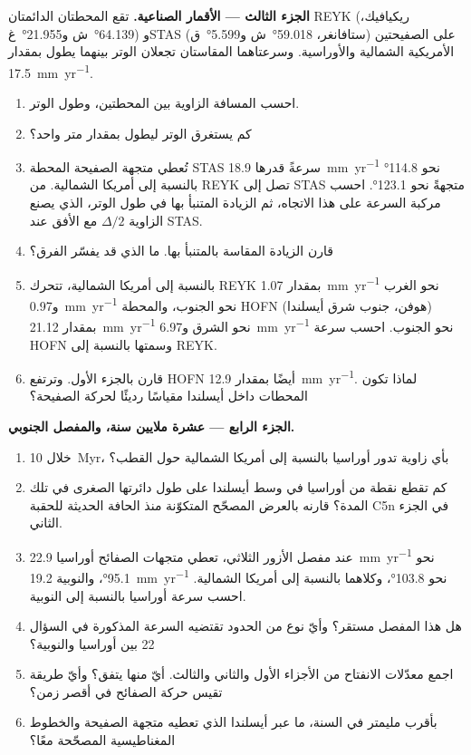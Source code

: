 \begin{problem}
\noindent\textbf{الجزء الثالث --- الأقمار الصناعية.}
تقع المحطتان الدائمتان REYK (ريكيافيك، \ang{64.139}~ش و\ang{21.955}~غ) وSTAS (ستافانغر، \ang{59.018}~ش و\ang{5.599}~ق) على الصفيحتين الأمريكية الشمالية والأوراسية. وسرعتاهما المقاستان تجعلان الوتر بينهما يطول بمقدار \qty{17.5}{mm.yr^{-1}}.
\begin{enumerate}[resume]
  \item احسب المسافة الزاوية بين المحطتين، وطول الوتر.
  \item كم يستغرق الوتر ليطول بمقدار متر واحد؟
  \item تُعطي متجهة الصفيحة المحطة STAS سرعةً قدرها \qty{18.9}{mm.yr^{-1}} نحو \ang{114.8} بالنسبة إلى أمريكا الشمالية.  من REYK تصل إلى STAS متجهةً نحو \ang{123.1}. احسب مركبة السرعة على هذا الاتجاه، ثم الزيادة المتنبأ بها في طول الوتر، الذي يصنع الزاوية $\Delta/2$ مع الأفق عند STAS.
  \item قارن الزيادة المقاسة بالمتنبأ بها. ما الذي قد يفسّر الفرق؟
  \item بالنسبة إلى أمريكا الشمالية، تتحرك REYK بمقدار \qty{1.07}{mm.yr^{-1}} نحو الغرب و\qty{0.97}{mm.yr^{-1}} نحو الجنوب، والمحطة HOFN (هوفن، جنوب شرق أيسلندا) بمقدار \qty{21.12}{mm.yr^{-1}} نحو الشرق و\qty{6.97}{mm.yr^{-1}} نحو الجنوب. احسب سرعة HOFN وسمتها بالنسبة إلى REYK.
  \item قارن بالجزء الأول. وترتفع HOFN أيضًا بمقدار \qty{12.9}{mm.yr^{-1}}. لماذا تكون المحطات داخل أيسلندا مقياسًا رديئًا لحركة الصفيحة؟
\end{enumerate}

\noindent\textbf{الجزء الرابع --- عشرة ملايين سنة، والمفصل الجنوبي.}
\begin{enumerate}[resume]
  \item خلال \qty{10}{Myr}، بأي زاوية تدور أوراسيا بالنسبة إلى أمريكا الشمالية حول القطب؟
  \item كم تقطع نقطة من أوراسيا في وسط أيسلندا على طول دائرتها الصغرى في تلك المدة؟ قارنه بالعرض المصحّح  المتكوّنة منذ الحافة الحديثة للحقبة C5n في الجزء الثاني.
  \item عند مفصل الأزور الثلاثي، تعطي متجهات الصفائح أوراسيا \qty{22.9}{mm.yr^{-1}} نحو \ang{95.1}، والنوبية \qty{19.2}{mm.yr^{-1}} نحو \ang{103.8}، وكلاهما بالنسبة إلى أمريكا الشمالية. احسب سرعة أوراسيا بالنسبة إلى النوبية.
  \item هل هذا المفصل مستقر؟ وأيّ نوع من الحدود تقتضيه السرعة المذكورة في السؤال 22 بين أوراسيا والنوبية؟
  \item اجمع معدّلات الانفتاح من الأجزاء الأول والثاني والثالث. أيّ منها يتفق؟ وأيّ طريقة تقيس حركة الصفائح في أقصر زمن؟
  \item بأقرب مليمتر في السنة، ما  عبر أيسلندا الذي تعطيه متجهة الصفيحة والخطوط المغناطيسية المصحّحة معًا؟
\end{enumerate}
\end{problem}
